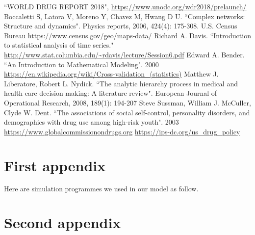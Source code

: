 \documentclass{mcmthesis}
\begin{document}
\newpage
\begin{thebibliography}{99}
	 ``WORLD DRUG REPORT 2018", \url{https://www.unodc.org/wdr2018/prelaunch/}
	 Boccaletti S, Latora V, Moreno Y, Chavez M, Hwang D U. ``Complex networks: Structure and dynamics". Physics reports, 2006, 424(4): 175-308.
	 U.S. Census Bureau  \url{https://www.census.gov/geo/maps-data/}
	 Richard A. Davis. ``Introduction to statistical analysis of time series." \url{http://www.stat.columbia.edu/~rdavis/lecture/Session6.pdf}
	 Edward A. Bender. ``An Introduction to Mathematical Modeling". 2000
	 \url{https://en.wikipedia.org/wiki/Cross-validation_(statistics)}
	 Matthew J. Liberatore, Robert L. Nydick. ``The analytic hierarchy process in medical and health care decision making: A literature review". European Journal of Operational Research, 2008, 189(1): 194-207
	 Steve Sussman, William J. McCuller, Clyde W. Dent. ``The associations of social self-control, personality disorders, and demographics with drug use among high-risk youth". 2003
	 \url{https://www.globalcommissionondrugs.org}
	 \url{https://ips-dc.org/us_drug_policy}
\end{thebibliography}

\newpage

\begin{appendices}
	
	\section{First appendix}
	
	\lipsum[13]
	
	Here are simulation programmes we used in our model as follow.\\
	
	
	\section{Second appendix}
	
	
	
\end{appendices}
	
	
\end{document}
